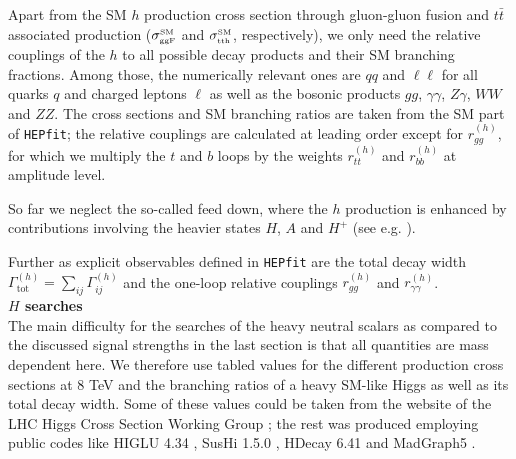 \documentclass[preprint,3p,12pt]{elsarticle}
\newcommand{\HEPfit}{\texttt{HEPfit}\xspace}
\begin{document}
Apart from the SM $h$ production cross section through gluon-gluon fusion and $t\bar{t}$ associated production ($\sigma^{\text{\tiny{SM}}}_{\text{\tiny{ggF}}}$ and $\sigma^{\text{\tiny{SM}}}_{\text{\tiny{tth}}}$, respectively), we only need the relative couplings of the $h$ to all possible decay products and their SM branching fractions.
Among those, the numerically relevant ones are $qq$ and $\ell \ell$ for all quarks $q$ and charged leptons $\ell$ as well as the bosonic products $gg$, $\gamma \gamma$, $Z \gamma$, $WW$ and $ZZ$. The cross sections and SM branching ratios are taken from the SM part of \HEPfit; the relative couplings are calculated at leading order except for $r_{gg}^{(h)}$, for which we multiply the $t$ and $b$ loops by the weights $r_{tt}^{(h)}$ and $r_{bb}^{(h)}$ at amplitude level.

So far we neglect the so-called feed down, where the $h$ production is enhanced by contributions involving the heavier states $H$, $A$ and $H^+$ (see e.g. \cite{Dumont:2014wha}).

Further as explicit observables defined in \HEPfit are the total decay width $\Gamma^{(h)}_{\text{tot}}=\sum_{ij}\Gamma_{ij}^{(h)}$ and the one-loop relative couplings $r_{gg}^{(h)}$ and $r_{\gamma \gamma}^{(h)}$.\\

\textbf{$H$ searches}\\

The main difficulty for the searches of the heavy neutral scalars as compared to the discussed signal strengths in the last section is that all quantities are mass dependent here. We therefore use tabled values for the different production cross sections at 8 TeV and the branching ratios of a heavy SM-like Higgs as well as its total decay width. Some of these values could be taken from the website of the LHC Higgs Cross Section Working Group \cite{LHCHXSWG}; the rest was produced employing public codes like HIGLU 4.34 \cite{Spira:1995mt}, SusHi 1.5.0 \cite{Harlander:2012pb}, HDecay 6.41 \cite{Djouadi:1997yw} and MadGraph5 \cite{Alwall:2014hca}.
\end{document}
